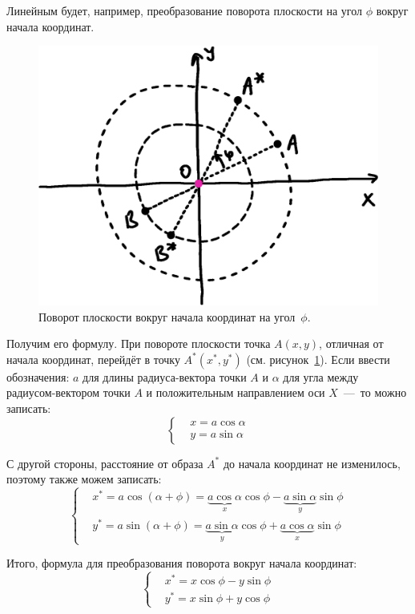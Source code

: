 \documentclass[a4paper,12pt]{article}
\begin{document}
  \begin{example}
    Линейным будет, например, преобразование поворота плоскости на угол $\phi$ вокруг начала координат.
    
    \begin{figure}
      \centering
      
      \includegraphics[width=0.6\columnwidth]{rotate-around-zero-inv}
      
      \caption{Поворот плоскости вокруг начала координат на угол~$\phi$.}
      \label{fig:rotate-around-zero-inv}
    \end{figure}
    
    Получим его формулу.
    При повороте плоскости точка $A(x, y)$, отличная от начала координат, перейдёт в точку $A^*(x^*, y^*)$ (см. рисунок~\ref{fig:rotate-around-zero-inv}).
    Если ввести обозначения: $a$ для длины радиуса-вектора точки $A$ и $\alpha$ для угла между радиусом-вектором точки $A$ и положительным направлением оси $X$~---~то можно записать:
    \[
      \left\{
        \begin{aligned}
          &x = a \cos \alpha\\
          &y = a \sin \alpha
        \end{aligned}
      \right.
    \]
    
    С другой стороны, расстояние от образа $A^*$ до начала координат не изменилось, поэтому также можем записать:
    \[
      \left\{
        \begin{aligned}
          &x^* = a \cos(\alpha + \phi) = \underbrace{a \cos\alpha}_{x} \cos\phi - \underbrace{a \sin\alpha}_{y} \sin\phi\\
          &y^* = a \sin(\alpha + \phi) = \underbrace{a \sin\alpha}_{y} \cos\phi + \underbrace{a \cos\alpha}_{x} \sin\phi
        \end{aligned}
      \right.
    \]
    
    Итого, формула для преобразования поворота вокруг начала координат:
    \begin{equation}\label{eq:rotate-around-zero}
      \boxed{
        \left\{
          \begin{aligned}
            &x^* = x \cos\phi - y \sin\phi\\
            &y^* = x \sin\phi + y \cos\phi
          \end{aligned}
        \right.
      }
    \end{equation}
  \end{example}
  
\end{document}
